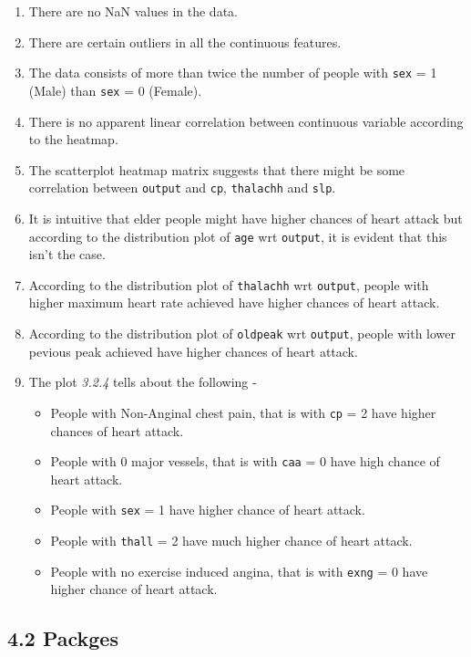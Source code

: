 \documentclass[11pt]{article}
\providecommand{\tightlist}{%
      \setlength{\itemsep}{0pt}\setlength{\parskip}{0pt}}
\begin{document}
\begin{enumerate}
\def\labelenumi{\arabic{enumi}.}
\tightlist
\item
  There are no NaN values in the data.
\item
  There are certain outliers in all the continuous features.
\item
  The data consists of more than twice the number of people with
  \texttt{sex} = 1 (Male) than \texttt{sex} = 0 (Female).
\item
  There is no apparent linear correlation between continuous variable
  according to the heatmap.
\item
  The scatterplot heatmap matrix suggests that there might be some
  correlation between \texttt{output} and \texttt{cp}, \texttt{thalachh}
  and \texttt{slp}.
\item
  It is intuitive that elder people might have higher chances of heart
  attack but according to the distribution plot of \texttt{age} wrt
  \texttt{output}, it is evident that this isn't the case.
\item
  According to the distribution plot of \texttt{thalachh} wrt
  \texttt{output}, people with higher maximum heart rate achieved have
  higher chances of heart attack.
\item
  According to the distribution plot of \texttt{oldpeak} wrt
  \texttt{output}, people with lower pevious peak achieved have higher
  chances of heart attack.
\item
  The plot \emph{3.2.4} tells about the following -

  \begin{itemize}
  \tightlist
  \item
    People with Non-Anginal chest pain, that is with \texttt{cp} = 2
    have higher chances of heart attack.
  \item
    People with 0 major vessels, that is with \texttt{caa} = 0 have high
    chance of heart attack.
  \item
    People with \texttt{sex} = 1 have higher chance of heart attack.
  \item
    People with \texttt{thall} = 2 have much higher chance of heart
    attack.
  \item
    People with no exercise induced angina, that is with \texttt{exng} =
    0 have higher chance of heart attack.
  \end{itemize}
\end{enumerate}

    \hypertarget{packges}{%
\subsection{4.2 Packges}\label{packges}}
\end{document}
